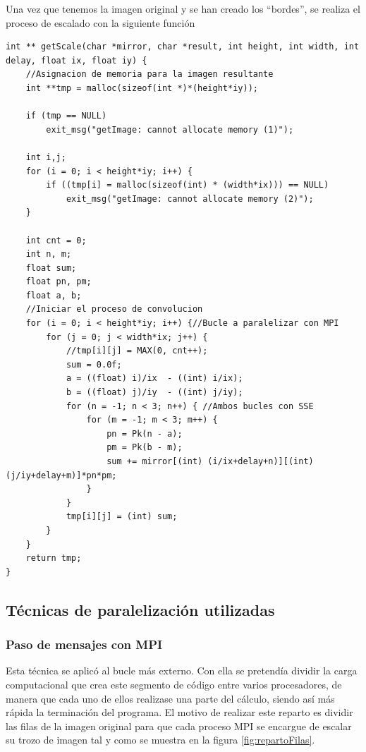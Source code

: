 \documentclass{article}
\begin{document}
Una vez que tenemos la imagen original y se han creado los ``bordes'', se realiza el proceso de escalado con la siguiente función

\begin{lstlisting}[style=C]
int ** getScale(char *mirror, char *result, int height, int width, int delay, float ix, float iy) {
	//Asignacion de memoria para la imagen resultante
	int **tmp = malloc(sizeof(int *)*(height*iy));
	
	if (tmp == NULL)
		exit_msg("getImage: cannot allocate memory (1)");
	
	int i,j;
	for (i = 0; i < height*iy; i++) {
		if ((tmp[i] = malloc(sizeof(int) * (width*ix))) == NULL)
			exit_msg("getImage: cannot allocate memory (2)");
	}

	int cnt = 0;
	int n, m;
	float sum;
	float pn, pm;
	float a, b;
	//Iniciar el proceso de convolucion
	for (i = 0; i < height*iy; i++) {//Bucle a paralelizar con MPI
		for (j = 0; j < width*ix; j++) {
			//tmp[i][j] = MAX(0, cnt++);
			sum = 0.0f;
			a = ((float) i)/ix  - ((int) i/ix);
			b = ((float) j)/iy  - ((int) j/iy);
			for (n = -1; n < 3; n++) { //Ambos bucles con SSE
				for (m = -1; m < 3; m++) {
					pn = Pk(n - a);
					pm = Pk(b - m);
					sum += mirror[(int) (i/ix+delay+n)][(int) (j/iy+delay+m)]*pn*pm;
				}
			}
			tmp[i][j] = (int) sum;	
		}
	}
	return tmp;
}
\end{lstlisting}

\subsection{Técnicas de paralelización utilizadas}
\subsubsection{Paso de mensajes con MPI}
Esta técnica se aplicó al bucle más externo. Con ella se pretendía dividir la carga computacional que crea este segmento de código entre varios procesadores, de manera que cada uno de ellos realizase una parte del cálculo, siendo así más rápida la terminación del programa. El motivo de realizar este reparto es dividir las filas de la imagen original para que cada proceso MPI se encargue de escalar su trozo de imagen tal y como se muestra en la figura \ref{fig:repartoFilas}.
\end{document}
